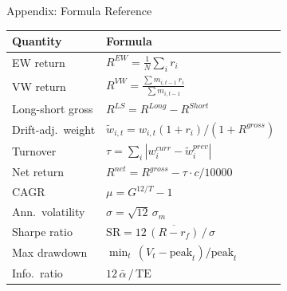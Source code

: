 \documentclass[aspectratio=169, 12pt]{beamer}
\begin{document}
\appendix

\begin{frame}{Appendix: Formula Reference}
  \renewcommand{\arraystretch}{1.55}
  \begin{tabular}{ll}
    \toprule
    Quantity & Formula \\
    \midrule
    EW return & $R^{EW} = \tfrac{1}{N}\sum_i r_i$ \\
    VW return & $R^{VW} = \tfrac{\sum m_{i,t-1}\,r_i}{\sum m_{i,t-1}}$ \\
    Long-short gross & $R^{LS} = R^{Long} - R^{Short}$ \\
    Drift-adj.\ weight & $\tilde{w}_{i,t} = w_{i,t}(1+r_i)/(1+R^{gross})$ \\
    Turnover & $\tau = \sum_i|w_i^{curr} - \tilde{w}_i^{prev}|$ \\
    Net return & $R^{net} = R^{gross} - \tau \cdot c/10000$ \\
    CAGR & $\mu = G^{12/T}-1$ \\
    Ann.\ volatility & $\sigma = \sqrt{12}\,\sigma_m$ \\
    Sharpe ratio & $\mathrm{SR} = 12\,\overline{(R-r_f)}\,/\,\sigma$ \\
    Max drawdown & $\min_t\,(V_t - \text{peak}_t)/\text{peak}_t$ \\
    Info.\ ratio & $12\,\bar{\alpha}\,/\,\mathrm{TE}$ \\
    \bottomrule
  \end{tabular}
\end{frame}
\end{document}

